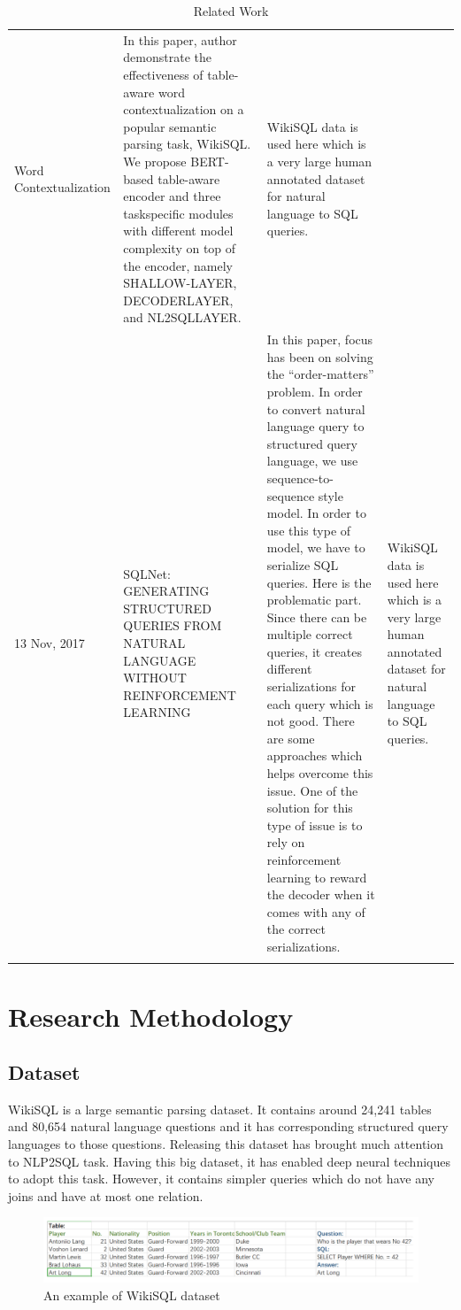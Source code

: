 \documentclass[12pt]{article}
\begin{document}
\begin{longtable}{| m{2cm} | m{4cm}| m{5cm} |m{4cm}|}
Word
Contextualization &In this paper, author
demonstrate the effectiveness
of table-aware word
contextualization
on a popular semantic parsing
task, WikiSQL. We propose
BERT-based table-aware
encoder and three taskspecific modules with
different model complexity on
top of the encoder, namely
SHALLOW-LAYER,
DECODERLAYER, and NL2SQLLAYER. &WikiSQL data is used here which
is a very large human annotated
dataset for natural language to
SQL queries.  \\ 
13 Nov, 2017 &SQLNet:
GENERATING
STRUCTURED
QUERIES FROM
NATURAL
LANGUAGE
WITHOUT
REINFORCEMENT
LEARNING & In this paper, focus has been
on solving the “order-matters”
problem. In order to convert
natural language query to
structured query language, we
use sequence-to-sequence
style model. In order to use
this type of model, we have to
serialize SQL queries. Here is
the problematic part. Since
there can be multiple correct
queries, it creates different
serializations for each query
which is not good. There are
some approaches which helps
overcome this issue. One of
the solution for this type of
issue is to rely on reinforcement learning to
reward the decoder when it
comes with any of the correct
serializations. &WikiSQL data is used here which
is a very large human annotated
dataset for natural language to
SQL queries.  \\ 
 \hline
\caption{Related Work}
\label{relatedwork}
\end{longtable}






\section{Research Methodology}
\subsection{Dataset}
WikiSQL is a large semantic parsing dataset. It contains around 24,241 tables and 80,654 natural language questions and it has corresponding structured query languages to those questions. Releasing this dataset has brought much attention to NLP2SQL task. Having this big dataset, it has enabled deep neural techniques to adopt this task. However, it contains simpler queries which do not have any joins and have at most one relation. 
\begin{figure}[H]
    \includegraphics[width=450pt]{wikisql}
	\caption{An example of WikiSQL dataset}
    \label{fig:WikiSQL}
\end{figure}
\end{document}
